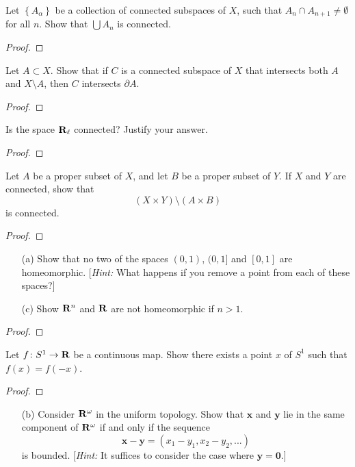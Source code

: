 \begin{problem}[Munkres \S23, Ex.\,3]
Let $\left\{A_\alpha\right\}$ be a collection of connected
subspaces of $X$, such that $A_n\cap A_{n+1}\neq\emptyset$ for
all $n$. Show that $\bigcup A_n$ is connected.
\end{problem}
\begin{proof}
\end{proof}
\newpage
\begin{problem}[Munkres \S23, Ex.\,6]
Let $A\subset X$. Show that if $C$ is a connected subspace of $X$
that intersects both $A$ and $X\setminus A$, then $C$ intersects
$\partial A$.
\end{problem}
\begin{proof}
\end{proof}
\newpage
\begin{problem}[Munkres \S23, Ex.\,7]
Is the space $\mathbf{R}_\ell$ connected? Justify your answer.
\end{problem}
\begin{proof}
\end{proof}
\newpage
\begin{problem}[Munkres \S23, Ex.\,9]
Let $A$ be a proper subset of $X$, and let $B$ be a proper subset
of $Y$. If $X$ and $Y$ are connected, show that
\[
(X\times Y)\setminus(A\times B)
\]
is connected.
\end{problem}
\begin{proof}
\end{proof}
\newpage
\begin{problem}[Munkres \S24, Ex.\,1(ac)]
\begin{enumerate}[noitemsep]
\item[(a)] Show that no two of the spaces $(0,1)$, $(0,1]$ and
  $[0,1]$ are homeomorphic. [\emph{Hint:} What happens if you
  remove a point from each of these spaces?]
\item[(c)] Show $\mathbf{R}^n$ and $\mathbf{R}$ are not homeomorphic if $n>1$.
\end{enumerate}
\end{problem}
\begin{proof}
\end{proof}
\newpage
\begin{problem}[Munkres \S24, Ex.\,2]
Let $f\colon S^1\to\mathbf{R}$ be a continuous map. Show there exists a
point $x$ of $S^1$ such that $f(x)=f(-x)$.
\end{problem}
\begin{proof}
\end{proof}
\newpage
\begin{problem}[Munkres \S25, Ex.\,2(b)]
\begin{enumerate}[noitemsep]
\item[(b)] Consider $\mathbf{R}^\omega$ in the uniform topology. Show
  that $\mathbf{x}$ and $\mathbf{y}$ lie in the same component of
  $\mathbf{R}^\omega$ if and only if the sequence
  \[
    \mathbf{x}-\mathbf{y}=\left(x_1-y_1,x_2-y_2,...\right)
  \]
  is bounded. [\emph{Hint:} It suffices to consider the case
  where $\mathbf{y}=\mathbf{0}$.]
\end{enumerate}
\end{problem}

